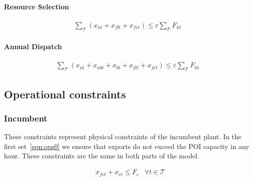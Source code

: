 \documentclass[9pt, oneside]{article}
\numberwithin{equation}{subsubsection}
\begin{document}
\paragraph{Resource Selection}
\begin{subequations}
	\begin{align}
		 & \sum_{ \mathcal{T}} \left( x_{nt} +x_{flt}+x_{fet} \right) \leq \varepsilon \sum_{ \mathcal{T}} F_{ht} & \label{eqn:fos2}
	\end{align}
\end{subequations}

\paragraph{Annual Dispatch}
\begin{subequations}
	\begin{align}
		 & \sum_{ \mathcal{T}} \left( x_{nt} + x_{nbt} + x_{bt} +x_{flt}+x_{fet} \right) \leq \varepsilon \sum_{ \mathcal{T}} F_{ht} & \label{eqn:fos2}
	\end{align}
\end{subequations}


\subsection{Operational constraints}\label{subsec:operational-constraints}

\subsubsection{Incumbent}\label{subsec:incumbent}
These constraints represent physical constraints of the incumbent plant.
In the first set~\ref{eqn:ops0} we ensure that exports do not exceed the POI capacity in any hour. These constraints are the same in both parts of the model.

\begin{subequations}
	\begin{align}
		 & x_{fet} + x_{et} \leq F_c & \forall t \in \mathcal{T}\label{eqn:ops0}
	\end{align}
\end{subequations}
\end{document}
